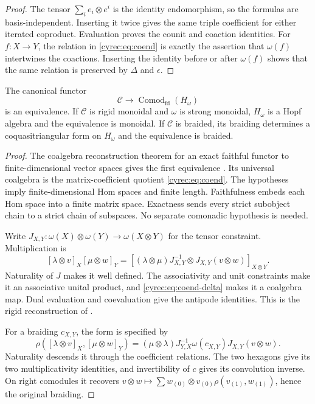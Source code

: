 \begin{proof}
The tensor $\sum_i e_i\otimes e^i$ is the identity endomorphism,
so the formulas are basis-independent. Inserting it twice gives
the same triple coefficient for either iterated coproduct.
Evaluation proves the counit and coaction identities.
For $f:X\to Y$, the relation in \eqref{cyrec:eq:coend} is exactly
the assertion that $\omega(f)$ intertwines the coactions. Inserting
the identity before or after $\omega(f)$ shows that the same
relation is preserved by $\Delta$ and $\epsilon$.
\end{proof}

\begin{theorem}
\label{cyrec:thm:tannaka}
The canonical functor
\[
 \mathcal C\longrightarrow\operatorname{Comod}_{\mathrm{fd}}(H_\omega)
\]
is an equivalence. If $\mathcal C$ is rigid monoidal and $\omega$
is strong monoidal, $H_\omega$ is a Hopf algebra and the equivalence
is monoidal. If $\mathcal C$ is braided, its braiding determines a
coquasitriangular form on $H_\omega$ and the equivalence is braided.
\end{theorem}

\begin{proof}
The coalgebra reconstruction theorem for an exact faithful functor
to finite-dimensional vector spaces gives the first equivalence
\cite[Theorem~1.10.1]{EGNOTensorCategories}. Its universal coalgebra
is the matrix-coefficient quotient \eqref{cyrec:eq:coend}.
The hypotheses imply finite-dimensional Hom spaces and finite
length. Faithfulness embeds each Hom space into a finite matrix
space. Exactness sends every strict subobject chain to a strict
chain of subspaces. No separate comonadic hypothesis is
needed.

Write $J_{X,Y}:\omega(X)\otimes\omega(Y)\to\omega(X\otimes Y)$
for the tensor constraint. Multiplication is
\begin{equation}\label{cyrec:eq:coend-product}
 [\lambda\otimes v]_X[\mu\otimes w]_Y
 =[(\lambda\otimes\mu)J_{X,Y}^{-1}
                         \otimes J_{X,Y}(v\otimes w)]_{X\otimes Y}.
\end{equation}
Naturality of $J$ makes it well defined. The associativity and unit
constraints make it an associative unital product, and
\eqref{cyrec:eq:coend-delta} makes it a coalgebra map.
Dual evaluation and coevaluation give the antipode identities.
This is the rigid reconstruction of
\cite[Theorem~5.4.1]{EGNOTensorCategories}.

For a braiding $c_{X,Y}$, the form is specified by
\begin{equation}\label{cyrec:eq:coend-form}
 \rho([\lambda\otimes v]_X,[\mu\otimes w]_Y)
 = (\mu\otimes\lambda)J_{Y,X}^{-1}
                  \omega(c_{X,Y})J_{X,Y}(v\otimes w).
\end{equation}
Naturality descends it through the coefficient relations.
The two hexagons give its two multiplicativity identities, and
invertibility of $c$ gives its convolution inverse. On right
comodules it recovers
$v\otimes w\mapsto\sum w_{(0)}\otimes v_{(0)}
\rho(v_{(1)},w_{(1)})$, hence the original braiding.
\end{proof}

